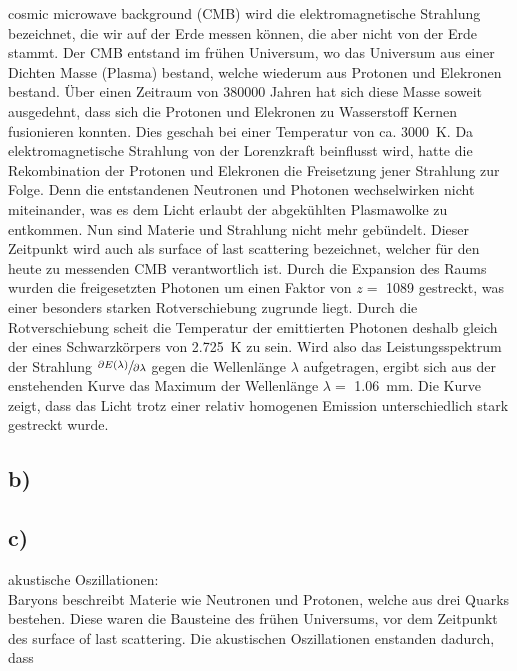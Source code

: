     \justifying cosmic microwave background (CMB) wird die elektromagnetische Strahlung bezeichnet, die wir auf der Erde messen können, die aber nicht von der Erde stammt. 
    Der CMB entstand im frühen Universum, wo das Universum aus einer Dichten Masse (Plasma) bestand, welche wiederum aus Protonen und Elekronen bestand. Über einen Zeitraum von 380000 Jahren
    hat sich diese Masse soweit ausgedehnt, dass sich die Protonen und Elekronen zu Wasserstoff Kernen fusionieren konnten. Dies geschah bei einer Temperatur von ca. 
    \SI{3000}{\kelvin}. Da elektromagnetische Strahlung von der Lorenzkraft beinflusst wird, hatte die Rekombination der Protonen und Elekronen die Freisetzung jener Strahlung zur Folge.
    Denn die entstandenen Neutronen und Photonen wechselwirken nicht miteinander, was es dem Licht erlaubt der abgekühlten Plasmawolke zu entkommen. Nun sind Materie und Strahlung nicht
    mehr gebündelt. Dieser Zeitpunkt wird auch als surface of last scattering bezeichnet, welcher für den heute zu messenden CMB verantwortlich ist. Durch die Expansion des Raums 
    wurden die freigesetzten Photonen um einen Faktor von $z=$ 1089 gestreckt, was einer besonders starken Rotverschiebung zugrunde liegt. Durch die Rotverschiebung scheit die Temperatur der emittierten Photonen
    deshalb gleich der eines Schwarzkörpers von \SI{2.725}{\kelvin} zu sein. Wird also das Leistungsspektrum der Strahlung $\sfrac{\partial E(\lambda)}{\partial \lambda}$ gegen die Wellenlänge
    $\lambda$ aufgetragen, ergibt sich aus der enstehenden Kurve das Maximum der Wellenlänge $\lambda=$ \SI{1.06}{\milli\meter}. Die Kurve zeigt, dass das Licht trotz einer relativ homogenen
    Emission unterschiedlich stark gestreckt wurde. 

\subsection{b)}



\subsection{c)}

    \justifying akustische Oszillationen:\\
    Baryons beschreibt Materie wie Neutronen und Protonen, welche aus drei Quarks bestehen. Diese waren die Bausteine des frühen Universums, vor dem Zeitpunkt des surface of last scattering.
    Die akustischen Oszillationen enstanden dadurch, dass  



